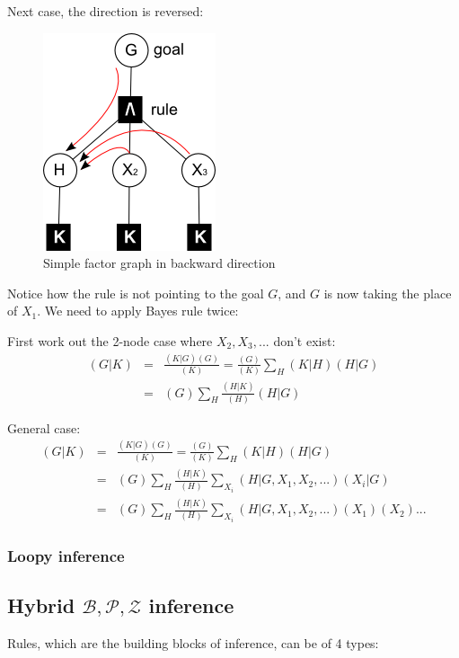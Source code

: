Next case, the direction is reversed:
\begin{figure}[H]
\centering
\includegraphics{simple-proof-tree3.png}
\caption{Simple factor graph in backward direction}
\end{figure}
Notice how the rule is not pointing to the goal $G$, and $G$ is now taking the place of $X_1$.  We need to apply Bayes rule twice:

First work out the 2-node case where $X_2, X_3, ...$ don't exist:\\
\begin{eqnarray*}
(G|K) &=& \frac{(K|G)(G)}{(K)} = \frac{(G)}{(K)} \sum_H (K|H)(H|G) \nonumber\\
      &=& (G) \sum_H \frac{(H|K)}{(H)} (H|G)
\end{eqnarray*}

General case:\\
\begin{eqnarray*}
(G|K) &=& \frac{(K|G)(G)}{(K)} = \frac{(G)}{(K)} \sum_H (K|H)(H|G) \nonumber\\
      &=& (G) \sum_H \frac{(H|K)}{(H)} \sum_{X_i} (H|G,X_1,X_2,...)(X_i|G) \nonumber\\
      &=& (G) \sum_H \frac{(H|K)}{(H)} \sum_{X_i} (H|G,X_1,X_2,...)(X_1)(X_2)...
\end{eqnarray*}

\subsubsection{Loopy inference}

\underconst

\subsection{Hybrid $\mathcal{B,P,Z}$ inference}

Rules, which are the building blocks of inference, can be of 4 types:

